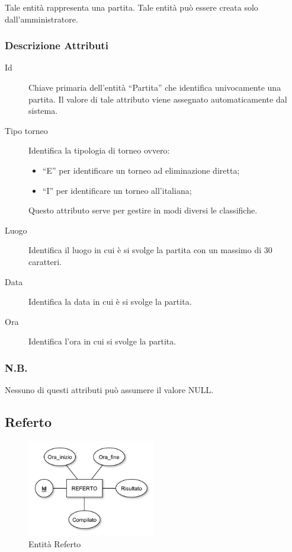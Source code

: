 		Tale entità rappresenta una partita. Tale entità può essere creata solo dall'amministratore.
		
		\subsubsection*{Descrizione Attributi}
		
		\begin{description}
			
			\item[Id]
			Chiave primaria dell'entità ``Partita'' che identifica univocamente una partita. Il valore di tale attributo viene assegnato automaticamente dal sistema.
			
			\item[Tipo torneo]
			Identifica la tipologia di torneo ovvero:
			\begin{itemize}
				\item
				``E'' per identificare un torneo ad eliminazione diretta;
				\item
				``I'' per identificare un torneo all'italiana;
			\end{itemize}
			Questo attributo serve per gestire in modi diversi le classifiche.
			
			\item[Luogo]
			Identifica il luogo in cui è si svolge la partita con un massimo di 30 caratteri.
			
			\item[Data]
			Identifica la data in cui è si svolge la partita.
			
			\item[Ora]
			Identifica l'ora in cui si svolge la partita.
			
		\end{description}
		
		\subsubsection*{N.B.}
		Nessuno di questi attributi può assumere il valore NULL.
	
	\subsection{Referto}
		
		\begin{figure}[h]
			\centering
			\includegraphics[width=0.5\textwidth]
			{immagini/08-referto}
			
			\caption{Entità Referto}
		\end{figure}
		
